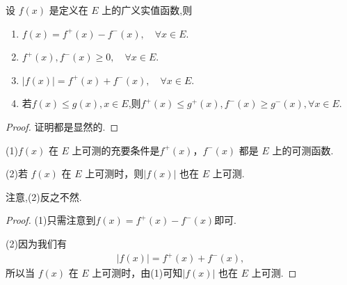 \documentclass[../../main.tex]{subfiles}%
\begin{document}
\begin{lemma}\label{lemma:函数的正部和负部的基本性质}
设 \(f(x)\) 是定义在 \(E\) 上的广义实值函数,则
\begin{enumerate}[(1)]
\item $f(x)=f^+(x)-f^-(x),\quad \forall x\in E.$

\item $f^+(x),f^-(x)\geqslant 0,\quad \forall x\in E.$

\item $\left| f\left( x \right) \right|=f^+\left( x \right) +f^-\left( x \right) ,\quad \forall x\in E.$

\item 若$f(x)\leqslant g(x),x\in E$,则$f^+(x)\leqslant g^+(x),f^-(x)\geqslant g^-(x),\forall x\in E.$
\end{enumerate}
\end{lemma}
\begin{proof}

证明都是显然的.

\end{proof}

\begin{theorem}
(1)\(f(x)\) 在 \(E\) 上可测的充要条件是\(f^+(x)\)，\(f^-(x)\) 都是 \(E\) 上的可测函数.

(2)若 \(f(x)\) 在 \(E\) 上可测时，则\(|f(x)|\) 也在 \(E\) 上可测.
\end{theorem}
\begin{remark}
注意,(2)反之不然.
\end{remark}
\begin{proof}

(1)只需注意到$f(x) = f^+(x) - f^-(x)$即可.

(2)因为我们有
\begin{align*}
|f(x)| = f^+(x) + f^-(x), 
\end{align*}
所以当 \(f(x)\) 在 \(E\) 上可测时，由(1)可知\(|f(x)|\) 也在 \(E\) 上可测.

\end{proof}
\end{document}
